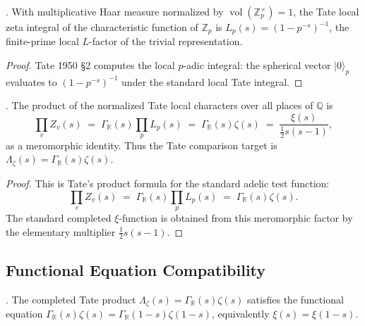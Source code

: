 \begin{proposition}[finite-prime Tate character \(= L_{p}(s)\)]
\label{v4-arith:lacd:prop:finite-character}
\ClaimStatusProvedHere. With multiplicative Haar measure normalized by
\(\operatorname{vol}(\mathbb Z_p^\times)=1\), the Tate local zeta
integral of the characteristic function of \(\mathbb Z_p\) is
\(L_{p}(s) = (1 - p^{-s})^{-1}\), the finite-prime local \(L\)-factor
of the trivial representation.
\end{proposition}

\begin{proof}
Tate 1950 \S2 computes the local \(p\)-adic integral: the spherical
vector \(|0\rangle_{p}\) evaluates to \((1 - p^{-s})^{-1}\) under the
standard local Tate integral.
\end{proof}

\begin{theorem}
\label{v4-arith:lacd:thm:xi-reproduced}
\ClaimStatusProvedHere. The product of the normalized Tate local
characters over all places of \(\mathbb Q\) is
\begin{equation}
\prod_v Z_v(s)
\;=\; \Gamma_{\mathbb{R}}(s)\prod_{p}L_{p}(s)
\;=\; \Gamma_{\mathbb{R}}(s)\zeta(s)
\;=\; \frac{\xi(s)}{\tfrac{1}{2}s(s-1)},
\end{equation}
as a meromorphic identity. Thus the Tate comparison target is
\(\Lambda_{\zeta}(s)=\Gamma_{\mathbb{R}}(s)\zeta(s)\).
\end{theorem}

\begin{proof}
This is Tate's product formula for the standard adelic test function:
\begin{equation}
\prod_v Z_v(s)
\;=\;\Gamma_{\mathbb{R}}(s)\prod_{p}L_{p}(s)
\;=\;\Gamma_{\mathbb{R}}(s)\zeta(s).
\end{equation}
The standard completed \(\xi\)-function is obtained from this
meromorphic factor by the elementary multiplier \(\tfrac12 s(s-1)\).
\end{proof}

\subsection{Functional Equation Compatibility}

\begin{corollary}
\label{v4-arith:lacd:cor:fe-preserved}
\ClaimStatusProvedHere. The completed Tate product
\(\Lambda_{\zeta}(s)=\Gamma_{\mathbb{R}}(s)\zeta(s)\) satisfies the
functional equation
\(\Gamma_{\mathbb{R}}(s)\zeta(s) = \Gamma_{\mathbb{R}}(1-s)\zeta(1-s)\),
equivalently \(\xi(s) = \xi(1-s)\).
\end{corollary}

